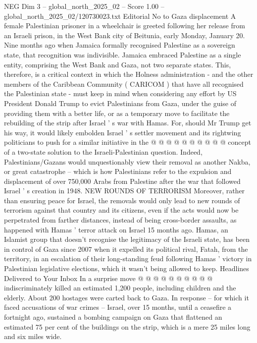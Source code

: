 \begin{textsample}{NEG Dim 3 – global\_north\_2025\_02 – Score 1.00 – global\_north\_2025\_02/120730023.txt}  \label{ex:f3_neg_176}
Editorial No to Gaza displacement A female Palestinian prisoner in a wheelchair is greeted following her release from an Israeli prison, in the West Bank city of Beitunia, early Monday, January 20.
Nine months ago when Jamaica formally recognised Palestine as a sovereign state, that recognition was indivisible.
Jamaica embraced Palestine as a single entity, comprising the West Bank and Gaza, not two separate states.
This, therefore, is a critical context in which the Holness administration - and the other members of the Caribbean Community ( CARICOM ) that have all recognised the Palestinian state - must keep in mind when considering any effort by US President Donald Trump to evict Palestinians from Gaza, under the guise of providing them with a better life, or as a temporary move to facilitate the rebuilding of the strip after Israel ' s war with Hamas.
For, should Mr Trump get his way, it would likely embolden Israel ' s settler movement and its rightwing politicians to push for a similar initiative in the @ @ @ @ @ @ @ @ @ @ concept of a two-state solution to the Israeli-Palestinian question.
Indeed, Palestinians/Gazans would unquestionably view their removal as another Nakba, or great catastrophe -- which is how Palestinians refer to the expulsion and displacement of over 750,000 Arabs from Palestine after the war that followed Israel ' s creation in 1948.
NEW ROUNDS OF TERRORISM Moreover, rather than ensuring peace for Israel, the removals would only lead to new rounds of terrorism against that country and its citizens, even if the acts would now be perpetrated from farther distances, instead of being cross-border assaults, as happened with Hamas ' terror attack on Israel 15 months ago.
Hamas, an Islamist group that doesn't recognise the legitimacy of the Israeli state, has been in control of Gaza since 2007 when it expelled its political rival, Fatah, from the territory, in an escalation of their long-standing feud following Hamas ' victory in Palestinian legislative elections, which it wasn't being allowed to keep.
Headlines Delivered to Your Inbox In a surprise move @ @ @ @ @ @ @ @ @ @ indiscriminately killed an estimated 1,200 people, including children and the elderly.
About 200 hostages were carted back to Gaza.
In response -- for which it faced accusations of war crimes -- Israel, over 15 months, until a ceasefire a fortnight ago, sustained a bombing campaign on Gaza that flattened an estimated 75 per cent of the buildings on the strip, which is a mere 25 miles long and six miles wide.

\end{textsample}
